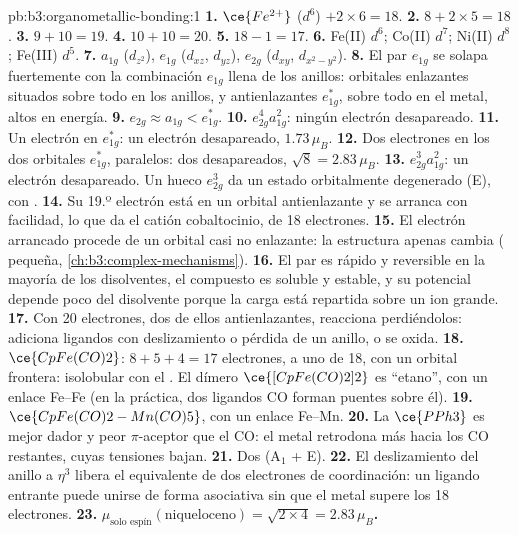 \begin{solution}{pb:b3:organometallic-bonding:1}
\textbf{1.} $\ce{Fe^{2+}}$ ($d^6$) $+ 2 \times 6 = 18$.
\textbf{2.} $8 + 2 \times 5 = 18$.
\textbf{3.} $9 + 10 = 19$.
\textbf{4.} $10 + 10 = 20$.
\textbf{5.} $18 - 1 = 17$.
\textbf{6.} Fe(II) $d^6$; Co(II) $d^7$; Ni(II) $d^8$; Fe(III) $d^5$.
\textbf{7.} $a_{1g}$ ($d_{z^2}$), $e_{1g}$ ($d_{xz}$, $d_{yz}$), $e_{2g}$ ($d_{xy}$, $d_{x^2-y^2}$).
\textbf{8.} El par $e_{1g}$ se solapa fuertemente con la combinación $e_{1g}$ llena de los anillos: orbitales
enlazantes situados sobre todo en los anillos, y antienlazantes $e_{1g}^\ast$, sobre todo en el metal, altos en
energía.
\textbf{9.} $e_{2g} \approx a_{1g} < e_{1g}^\ast$.
\textbf{10.} $e_{2g}^4a_{1g}^2$: ningún electrón desapareado.
\textbf{11.} Un electrón en $e_{1g}^\ast$: un electrón desapareado, $1.73\,\mu_B$.
\textbf{12.} Dos electrones en los dos orbitales $e_{1g}^\ast$, paralelos: dos desapareados, $\sqrt{8} =
2.83\,\mu_B$.
\textbf{13.} $e_{2g}^3a_{1g}^2$: un electrón desapareado. Un hueco $e_{2g}^3$ da un estado orbitalmente degenerado
(E), con .
\textbf{14.} Su 19.º electrón está en un orbital antienlazante y se arranca con facilidad,
lo que da el catión cobaltocinio, de 18 electrones.
\textbf{15.} El electrón arrancado procede de un orbital casi no enlazante: la
estructura apenas cambia ( pequeña, \cref{ch:b3:complex-mechanisms}).
\textbf{16.} El par es rápido y reversible en la mayoría de los disolventes, el compuesto es
soluble y estable, y su potencial depende poco del disolvente porque la
carga está repartida sobre un ion grande.
\textbf{17.} Con 20 electrones, dos de ellos antienlazantes, reacciona perdiéndolos:
adiciona ligandos con deslizamiento o pérdida de un anillo, o se oxida.
\textbf{18.} $\ce{CpFe(CO)2}$: $8 + 5 + 4 = 17$ electrones, a uno de 18, con un orbital frontera: isolobular
con el . El dímero $\ce{[CpFe(CO)2]2}$ es ``etano'', con un enlace Fe--Fe (en la práctica, dos ligandos CO
forman puentes sobre él).
\textbf{19.} $\ce{CpFe(CO)2-Mn(CO)5}$, con un enlace Fe--Mn.
\textbf{20.} La $\ce{PPh3}$ es mejor dador y peor $\pi$-aceptor que el CO: el metal retrodona
más hacia los CO restantes, cuyas tensiones bajan.
\textbf{21.} Dos (A$_1$ + E).
\textbf{22.} El deslizamiento del anillo a $\eta^3$ libera el equivalente de dos electrones de coordinación: un ligando
entrante puede unirse de forma asociativa sin que el metal supere los 18 electrones.
\textbf{23.} \textbf{$\mu_{\text{solo espín}}(\text{niqueloceno}) = \sqrt{2 \times 4} = 2.83\,\mu_B$.}
\end{solution}
